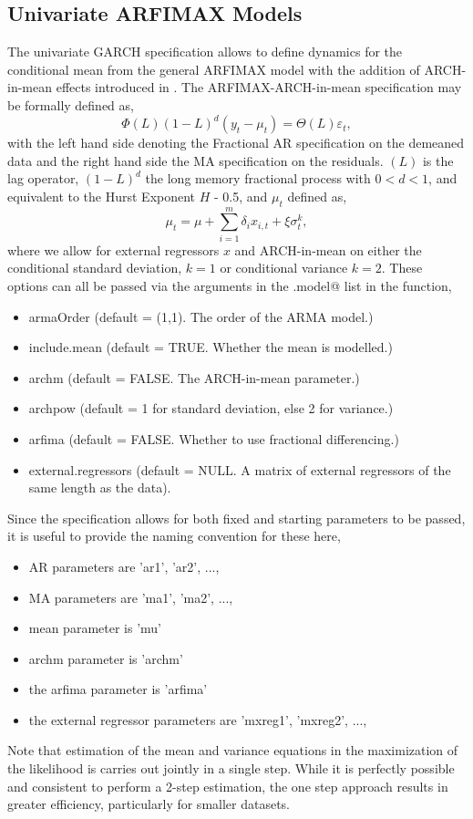 \subsection{Univariate ARFIMAX Models}\label{section:umean}
The univariate GARCH specification allows to define dynamics for the conditional
mean from the general ARFIMAX model with the addition of ARCH-in-mean effects
introduced in \citet{EngleLilienRobbins}.
The ARFIMAX-ARCH-in-mean specification may be formally defined as,
\begin{equation}\label{arfimax1}
\Phi(L){(1 - L)^d}({y_t} - {\mu _t}) = \Theta (L){\varepsilon _t},
\end{equation}
with the left hand side denoting the Fractional AR specification on the demeaned
data and the right hand side the MA specification on the residuals. $(L)$ is the
lag operator, $(1 - L)^d$ the long memory fractional process with $0 < d < 1$,
and equivalent to the Hurst Exponent $H$ - 0.5, and $\mu_t$ defined as,
\begin{equation}\label{arfimax2}
{\mu _t} = \mu  + \sum\limits_{i = 1}^{m} {{\delta _i}} {x_{i,t}} + \xi \sigma _t^k,
\end{equation}
where we allow for \verb@m@ external regressors $x$ and ARCH-in-mean on either
the conditional standard deviation, $k=1$ or conditional variance $k=2$.
These options can all be passed via the arguments in the \verb@mean.model@ list
in the \verb@ugarchspec@ function,
\begin{itemize}
\item armaOrder 	   (default = (1,1). The order of the ARMA model.)
\item include.mean 	   (default = TRUE.  Whether the mean is modelled.)
\item archm			   (default = FALSE. The ARCH-in-mean parameter.)
\item archpow   	   (default = 1 for standard deviation, else 2 for variance.)
\item arfima	   	   (default = FALSE. Whether to use fractional differencing.)
\item external.regressors (default = NULL. A matrix of external regressors of
the same length as the data).
\end{itemize}
Since the specification allows for both fixed and starting parameters to be
passed, it is useful to provide the naming convention for these here,
\begin{itemize}
\item AR parameters are 'ar1', 'ar2', ...,
\item MA parameters are 'ma1', 'ma2', ...,
\item mean parameter is 'mu'
\item archm parameter is 'archm'
\item the arfima parameter is 'arfima'
\item the external regressor parameters are 'mxreg1', 'mxreg2', ...,
\end{itemize}
Note that estimation of the mean and variance equations in the maximization of
the likelihood is carries out jointly in a single step. While it is perfectly
possible and consistent to perform a 2-step estimation, the one step approach
results in greater efficiency, particularly for smaller datasets.
